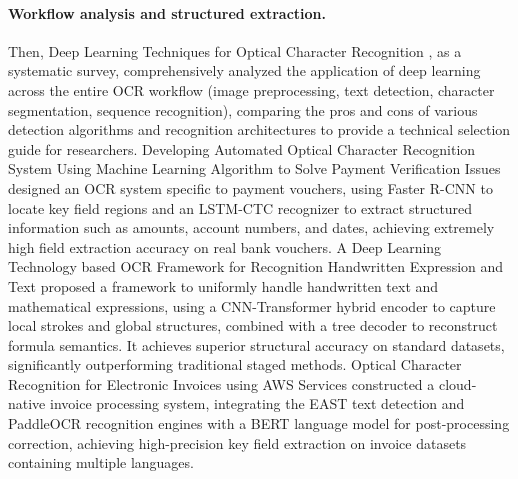 \paragraph{Workflow analysis and structured extraction.}
Then, Deep Learning Techniques for Optical Character Recognition \cite{vinciarelli2020survey}, as a systematic survey, comprehensively analyzed the application of deep learning across the entire OCR workflow (image preprocessing, text detection, character segmentation, sequence recognition), comparing the pros and cons of various detection algorithms and recognition architectures to provide a technical selection guide for researchers. Developing Automated Optical Character Recognition System Using Machine Learning Algorithm to Solve Payment Verification Issues \cite{ismail2021payment} designed an OCR system specific to payment vouchers, using Faster R-CNN to locate key field regions and an LSTM-CTC recognizer to extract structured information such as amounts, account numbers, and dates, achieving extremely high field extraction accuracy on real bank vouchers. A Deep Learning Technology based OCR Framework for Recognition Handwritten Expression and Text \cite{zhang2022expression} proposed a framework to uniformly handle handwritten text and mathematical expressions, using a CNN-Transformer hybrid encoder to capture local strokes and global structures, combined with a tree decoder to reconstruct formula semantics. It achieves superior structural accuracy on standard datasets, significantly outperforming traditional staged methods. Optical Character Recognition for Electronic Invoices using AWS Services \cite{reddy2021invoice} constructed a cloud-native invoice processing system, integrating the EAST text detection and PaddleOCR recognition engines with a BERT language model for post-processing correction, achieving high-precision key field extraction on invoice datasets containing multiple languages.

